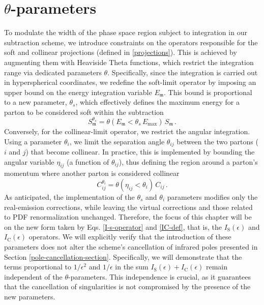 \documentclass[a4paper, 12pt]{book}
\newcommand{\um}{\mathfrak{m}}
\begin{document}
\section{$\theta$-parameters}
To modulate the width of the phase space region subject to integration in our subtraction scheme, we introduce constraints on the operators responsible for the soft and collinear projections (defined in \ref{projections}). This is achieved by augmenting them with Heaviside Theta functions, which restrict the integration range via dedicated parameters $\theta$. Specifically, since the integration is carried out in hyperspherical coordinates, we redefine the soft-limit operator by imposing an upper bound on the energy integration variable $E_\um$. This bound is proportional to a new parameter, $\theta_s$, which effectively defines the maximum energy for a parton to be considered soft within the subtraction
\begin{equation}
S_\um^{\theta_s} = \theta{(E_\um < \theta_s \, E_{\mathrm{max}})} \, S_\um \,.
\end{equation}
Conversely, for the collinear-limit operator, we restrict the angular integration. Using a parameter $\theta_i$, we limit the separation angle $\theta_{ij}$ between the two partons ($i$ and $j$) that become collinear. In practice, this is implemented by bounding the angular variable $\eta_{ij}$ (a function of $\theta_{ij}$), thus defining the region around a parton's momentum where another parton is considered collinear
\begin{equation}
C_{ij}^{\theta_i} = \theta{(\eta_{ij} < \theta_i )} \, C_{ij}\, .
\end{equation}
As anticipated, the implementation of the $\theta_s$ and $\theta_i$ parameters modifies only the real-emission corrections, while leaving the virtual corrections and those related to PDF renormalization unchanged. Therefore, the focus of this chapter will be on the new form taken by Eqs. \ref{I-s-operator} and \ref{IC-def}, that is, the $I_{\mathrm{S}}(\epsilon)$ and $I_{\mathrm{C}}(\epsilon)$ operators. We will explicitly verify that the introduction of these parameters does not alter the scheme's cancellation of infrared poles presented in Section \ref{pole-cancellation-section}. Specifically, we will demonstrate that the terms proportional to $1/\epsilon^2$ and $1/\epsilon$ in the sum $I_{\mathrm{S}}(\epsilon) + I_{\mathrm{C}}(\epsilon)$ remain independent of the $\theta$-parameters. This independence is crucial, as it guarantees that the cancellation of singularities is not compromised by the presence of the new parameters.
\end{document}
